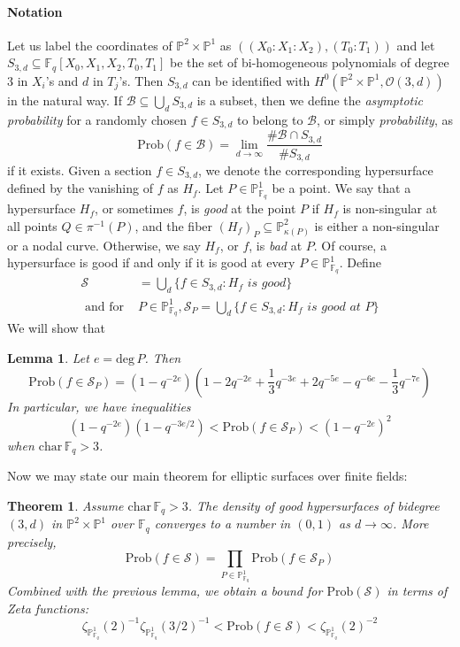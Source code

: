 \documentclass[12pt]{article}
\theoremstyle{plain}
\newtheorem{theorem}[equation]{Theorem}
\newtheorem{lemma}[equation]{Lemma}
\theoremstyle{definition}
\newcommand{\IF}{\mathbb{F}}
\newcommand{\IP}{\mathbb{P}}
\newcommand{\sB}{\mathcal{B}}
\newcommand{\sO}{\mathcal{O}}
\newcommand{\sS}{\mathcal{S}}
\renewcommand{\deg}{\mathrm{deg}\,}
\newcommand\union{\bigcup}
\newcommand{\<}{\langle}
\renewcommand{\>}{\rangle}
\newcommand{\Prob}{\mathrm{Prob}}
\begin{document}
\paragraph{Notation} Let us label the coordinates of $\IP^2 \times \IP^1$ as $((X_0 : X_1 : X_2), (T_0 : T_1))$ and let $S_{3,d} \subseteq \IF_q[X_0, X_1, X_2, T_0, T_1]$ be the set of bi-homogeneous polynomials of degree $3$ in $X_i$'s and $d$ in $T_j$'s. Then $S_{3, d}$ can be identified with $H^0(\IP^2 \times \IP^1, \sO(3, d))$ in the natural way. If $\sB \subseteq \union_d S_{3, d}$ is a subset, then we define the \textit{asymptotic probability} for a randomly chosen $f \in S_{3, d}$ to belong to $\sB$, or simply \textit{probability}, as 
$$ \Prob(f \in \sB) = \lim_{d \to \infty} \frac{\# \sB \cap S_{3, d}}{\# S_{3, d}} $$
if it exists. Given a section $f \in S_{3, d}$, we denote the corresponding hypersurface defined by the vanishing of $f$ as $H_f$. Let $P \in \IP^1_{\IF_q}$ be a point. We say that a hypersurface $H_f$, or sometimes $f$, is \textit{good} at the point $P$ if $H_f$ is non-singular at all points $Q \in \pi^{-1}(P)$, and the fiber $(H_f)_P \subseteq \IP^2_{\kappa(P)}$ is either a non-singular or a nodal curve. Otherwise, we say $H_f$, or $f$, is \textit{bad} at $P$. Of course, a hypersurface is good if and only if it is good at every $P \in \IP^1_{\IF_q}$. 
Define 
\begin{align*} 
\sS &= \union_{d} \{ f \in S_{3, d} : H_f \textit{ is good} \} \\
\text{ and for }&P \in \IP^1_{\IF_q}, \sS_P = \union_{d} \{ f \in S_{3, d} : H_f \textit{ is good at }P \} 
\end{align*}
We will show that 
\begin{lemma}
\label{pcount}
Let $e = \deg P$. Then 
$$\Prob(f \in \sS_{P}) = (1 - q^{-2e})(1 - 2q^{-2e} + \frac{1}{3} q^{-3e} + 2 q^{-5e} - q^{-6e} - \frac{1}{3} q^{-7e})$$
In particular, we have inequalities $$(1 - q^{-2e})(1 - q^{-3e/2}) < \Prob(f \in \sS_{P}) < (1 - q^{-2e})^2$$
when $\mathrm{char} \, \IF_q > 3$.
\end{lemma}
Now we may state our main theorem for elliptic surfaces over finite fields:
\begin{theorem}
\label{EllipticMainThm} Assume $\mathrm{char} \, \IF_q > 3$. The density of good hypersurfaces of bidegree $(3, d)$ in $\IP^2 \times \IP^1$ over $\IF_q$ converges to a number in $(0, 1)$ as $d \to \infty$. More precisely,  
$$ \Prob(f \in \sS) = \prod_{P \in \IP^1_{\IF_q}} \Prob( f \in \sS_{P}) $$
Combined with the previous lemma, we obtain a bound for $\Prob(\sS)$ in terms of Zeta functions:
$$ \zeta_{\IP^1_{\IF_q}}(2)^{-1} \zeta_{\IP^1_{\IF_q}}(3/2)^{-1} < \Prob(f \in \sS) < \zeta_{\IP^1_{\IF_q}}(2)^{-2}$$
\end{theorem}
\end{document}
